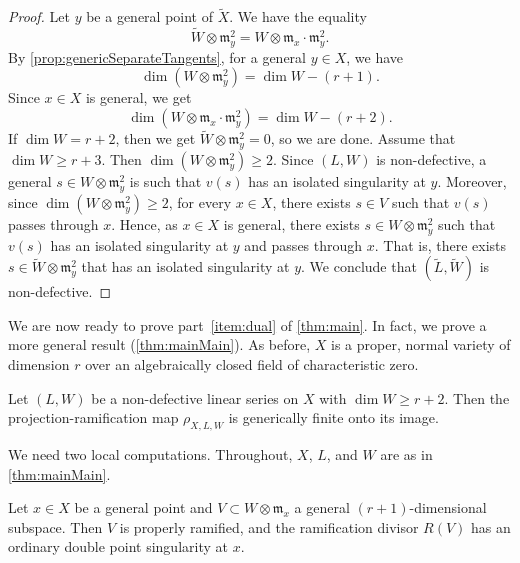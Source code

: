 \begin{proof}
  Let $y$ be a general point of $\widetilde X$.
  We have the equality
  \[ \widetilde W \otimes \mathfrak m_y^2 = W \otimes \mathfrak m_x \cdot \mathfrak m_y^2. \]
  By \autoref{prop:genericSeparateTangents}, for a general $y \in X$, we have
  \[ \dim (W \otimes \mathfrak m_y^2) = \dim W - (r+1).\]
  Since $x \in X$ is general, we get
  \[ \dim (W \otimes \mathfrak m_x \cdot \mathfrak m_y^2) = \dim W - (r+2).\]
  If $\dim W = r+2$, then we get $\widetilde W \otimes \mathfrak m_y^2 = 0$, so we are done.
  Assume that $\dim W \geq r+3$.
  Then $\dim (W \otimes \mathfrak m_y^2) \geq 2$.
  Since $(L, W)$ is non-defective, a general $s \in W \otimes \mathfrak m_y^2$ is such that $v(s)$ has an isolated singularity at $y$.
  Moreover, since $\dim (W \otimes \mathfrak m_y^2) \geq 2$, for every $x \in X$, there exists $s \in V$ such that $v(s)$ passes through $x$.
  Hence, as $x \in X$ is general, there exists $s \in W \otimes \mathfrak m_y^2$ such that $v(s)$ has an isolated singularity at $y$ and passes through $x$.
  That is, there exists $s \in \widetilde W \otimes \mathfrak m_y^2 $ that has an isolated singularity at $y$.
  We conclude that $(\widetilde L, \widetilde W)$ is non-defective.
\end{proof}


We are now ready to prove part~\eqref{item:dual} of \autoref{thm:main}.
In fact, we prove a more general result (\autoref{thm:mainMain}).
As before, $X$ is a proper, normal variety of dimension $r$ over an algebraically closed field of characteristic zero.
\begin{theorem}
  \label{thm:mainMain}
  Let $(L, W)$ be a non-defective linear series on $X$ with $\dim W \geq r+2$.
  Then the projection-ramification map $\rho_{X,L,W}$ is generically finite onto its image.
\end{theorem}

We need two local computations.
Throughout, $X$, $L$, and $W$ are as in \autoref{thm:mainMain}.

\begin{lemma}\label{lem:tangentconeram}
  Let $x \in X$ be a general point and $V \subset W \otimes \mathfrak m_x$ a general $(r+1)$-dimensional subspace.
  Then $V$ is properly ramified, and the ramification divisor $R(V)$ has an ordinary double point singularity at $x$.
\end{lemma}

